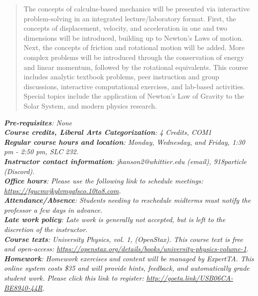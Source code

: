 \documentclass[10pt]{article}
\begin{document}
\maketitle

\begin{abstract}
The concepts of calculus-based mechanics will be presented via interactive problem-solving in an integrated lecture/laboratory format.  First, the concepts of displacement, velocity, and acceleration in one and two dimensions will be introduced, building up to Newton's Laws of motion.  Next, the concepts of friction and rotational motion will be added.  More complex problems will be introduced through the conservation of energy and linear momentum, followed by the rotational equivalents.  This course includes analytic textbook problems, peer instruction and group discussions, interactive computational exercises, and lab-based activities.  Special topics include the application of Newton's Law of Gravity to the Solar System, and modern physics research.
\end{abstract}
\noindent
\textit{\textbf{Pre-requisites}: None} \\
\textit{\textbf{Course credits, Liberal Arts Categorization}: 4 Credits, COM1} \\
\textit{\textbf{Regular course hours and location}: Monday, Wednesday, and Friday, 1:30 pm - 2:50 pm, SLC 232.} \\
\textit{\textbf{Instructor contact information}: jhanson2@whittier.edu (email), 918particle (Discord).} \\
\textit{\textbf{Office hours}: Please use the following link to schedule meetings: \url{https://fgucmvjkylvmgqfsco.10to8.com}.} \\
\textit{\textbf{Attendance/Absence}: Students needing to reschedule midterms must notify the professor a few days in advance.} \\ 
\textit{\textbf{Late work policy}: Late work is generally not accepted, but is left to the discretion of the instructor.} \\
\textit{\textbf{Course texts}: University Physics, vol. 1, (OpenStax).  This course text is free and open-access: \url{https://openstax.org/details/books/university-physics-volume-1}.} \\
\textit{\textbf{Homework}: Homework exercises and content will be managed by ExpertTA.  This online system costs \$35 and will provide hints, feedback, and automatically grade student work.  Please click this link to register: \url{http://goeta.link/USB06CA-BE8940-44R}.} \\
\end{document}
